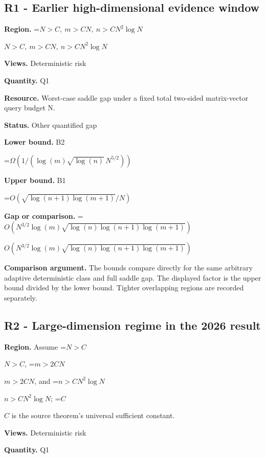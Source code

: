 \documentclass[10pt,a4paper]{article}
\newcommand{\AtlasMath}[1]{\par\begingroup\centering\setbox0=\hbox{$\displaystyle #1$}\ifdim\wd0>1.4\linewidth\typeout{ATLAS WIDE FORMULA: \the\wd0}\fi\ifdim\wd0>\linewidth\resizebox{\linewidth}{!}{\box0}\else\box0\fi\par\endgroup}
\newcommand{\AtlasInlineMath}[1]{\begingroup\setbox0=\hbox{$#1$}\ifdim\wd0>.4\linewidth\endgroup\AtlasMath{#1}\else\endgroup$#1$\fi}
\begin{document}
\subsection{R1 - Earlier high-dimensional evidence window}


\textbf{Region.} \AtlasInlineMath{N>C,\ m>C N,\ n>C N^2\log N}



\textbf{Views.} Deterministic risk



\textbf{Quantity.} Q1



\textbf{Resource.} Worst-case saddle gap under a fixed total two-sided matrix-vector query budget N.



\textbf{Status.} Other quantified gap



\textbf{Lower bound.} B2



\AtlasMath{\Omega(1/(\log(m)\sqrt{\log(n)}\,N^{5/2}))}


\textbf{Upper bound.} B1



\AtlasMath{O(\sqrt{\log(n+1)\log(m+1)}/N)}


\textbf{Gap or comparison.} \AtlasInlineMath{O\!\left(N^{3/2}\log(m)\sqrt{\log(n)\log(n+1)\log(m+1)}\right)}



\textbf{Comparison argument.} The bounds compare directly for the same arbitrary adaptive deterministic class and full saddle gap. The displayed factor is the upper bound divided by the lower bound. Tighter overlapping regions are recorded separately.



\subsection{R2 - Large-dimension regime in the 2026 result}


\textbf{Region.} Assume \AtlasInlineMath{N>C}, \AtlasInlineMath{m>2CN}, and \AtlasInlineMath{n>CN^2\log N}; \AtlasInlineMath{C} is the source theorem's universal sufficient constant.



\textbf{Views.} Deterministic risk



\textbf{Quantity.} Q1
\end{document}
